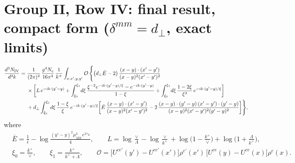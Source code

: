 \documentclass[11pt]{article}
\begin{document}
\section*{Group II, Row IV: final result, compact form ($\delta^{mm}=d_\perp$, exact limits)}
\begin{align}
\frac{d^{3}N_{\rm IV}}{d^{3}k}={}&\frac{1}{(2\pi)^{3}}\,\frac{g^{4}N_{c}}{16\pi^{4}}\,\frac{1}{k^{+}}\int_{x,x',y,y'}\mathcal{O}\,\Bigg\{\big(d_{\perp}\bar{E}-2\big)\,\frac{(x-y)\cdot(x'-y')}{(x-y)^{2}(x'-y')^{2}}\notag\\
&\times\bigg[L\,e^{-ik\cdot(y'-y)}+\int_{\xi_0}^{\xi_1}\!d\xi\,\frac{\xi^{-2}e^{-ik\cdot(y'-y)/\xi}-e^{-ik\cdot(y'-y)}}{1-\xi}+\int_{\xi_0}^{\xi_1}\!d\xi\,\frac{1-2\xi}{\xi^{3}}\,e^{-ik\cdot(y'-y)/\xi}\bigg]\notag\\
&+d_{\perp}\int_{\xi_0}^{\xi_1}\!d\xi\,\frac{1-\xi}{\xi}\,e^{-ik\cdot(y'-y)/\xi}\bigg[\bar{E}\,\frac{(x-y)\cdot(x'-y')}{(x-y)^{2}(x'-y')^{2}}-2\,\frac{(x-y)\cdot(y'-y)\,(x'-y')\cdot(y'-y)}{(x-y)^{2}(x'-y')^{2}(y'-y)^{2}}\bigg]\Bigg\},
\end{align}
where
\begin{align*}
&\bar{E}=\frac{1}{\bar\epsilon}-\log\frac{(y'-y)^{2}\mu^{2}_{\overline{MS}}\,e^{2\gamma_{E}}}{4},\qquad
L=\log\frac{\vee}{\Lambda}-\log\frac{\vee}{k^{+}}+\log\Big(1-\frac{k^{+}}{\vee}\Big)+\log\Big(1+\frac{\Lambda}{k^{+}}\Big),\\
&\xi_0=\frac{k^{+}}{\vee},\qquad \xi_1=\frac{k^{+}}{k^{+}+\Lambda},\qquad
\mathcal{O}=\Big[U^{ce'}(y')-U^{ce'}(x')\Big]\rho^{e'}(x')\,\Big[U^{ce}(y)-U^{ce}(x)\Big]\rho^{e}(x).
\end{align*}
\end{document}
